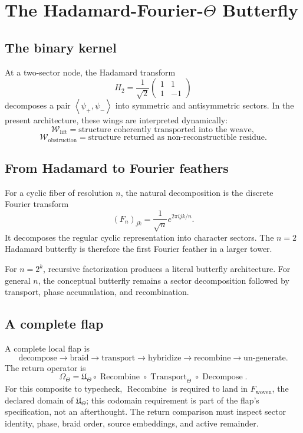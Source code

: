 \documentclass[12pt,openany]{book}
\theoremstyle{remark}
\newcommand{\UTheta}{\mathfrak U_{\Theta}}
\newcommand{\typedtuple}[1]{\left\langle #1 \right\rangle}
\begin{document}
\chapter{The Hadamard-Fourier-\texorpdfstring{$\Theta$}{Theta} Butterfly}
\label{ch:butterfly}

\section{The binary kernel}
At a two-sector node, the Hadamard transform
\[
H_2=\frac1{\sqrt2}
\begin{pmatrix}
1&1\\
1&-1
\end{pmatrix}
\]
decomposes a pair $\typedtuple{\psi_+,\psi_-}$ into symmetric and antisymmetric sectors. In the present architecture, these wings are interpreted dynamically:
\[
\mathcal W_{\mathrm{lift}}
=\text{structure coherently transported into the weave},
\]
\[
\mathcal W_{\mathrm{obstruction}}
=\text{structure returned as non-reconstructible residue}.
\]

\section{From Hadamard to Fourier feathers}
For a cyclic fiber of resolution $n$, the natural decomposition is the discrete Fourier transform \cite{CooleyTukey}
\[
(F_n)_{jk}=
\frac1{\sqrt n}e^{2\pi ijk/n}.
\]
It decomposes the regular cyclic representation into character sectors. The $n=2$ Hadamard butterfly is therefore the first Fourier feather in a larger tower.

For $n=2^k$, recursive factorization produces a literal butterfly architecture. For general $n$, the conceptual butterfly remains a sector decomposition followed by transport, phase accumulation, and recombination.

\section{A complete flap}
A complete local flap is
\[
\text{decompose}
\to
\text{braid}
\to
\text{transport}
\to
\text{hybridize}
\to
\text{recombine}
\to
\text{un-generate}.
\]
The return operator is
\[
\Omega_\Theta
=
\UTheta
\circ
\operatorname{Recombine}
\circ
\operatorname{Transport}_\Theta
\circ
\operatorname{Decompose}.
\]
For this composite to typecheck, $\operatorname{Recombine}$ is required to land in $F_{\mathrm{woven}}$, the declared domain of $\UTheta$; this codomain requirement is part of the flap's specification, not an afterthought. The return comparison must inspect sector identity, phase, braid order, source embeddings, and active remainder.
\end{document}

